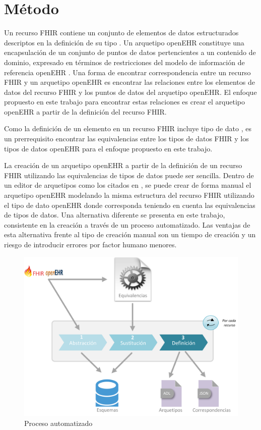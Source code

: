 \section{Método}

Un recurso FHIR contiene un conjunto de elementos de datos estructurados descriptos en la definición de su tipo \cite{FHIRResource}. Un arquetipo openEHR constituye una encapsulación de un conjunto de puntos de datos pertencientes a un contenido de dominio, expresado en términos de restricciones del modelo de información de referencia openEHR \cite{openEHRArchetype}. Una forma de encontrar correspondencia entre un recurso FHIR y un arquetipo openEHR es encontrar las relaciones entre los elementos de datos del recurso FHIR y los puntos de datos del arquetipo openEHR. El enfoque propuesto en este trabajo para encontrar estas relaciones es crear el arquetipo openEHR a partir de la definición del recurso FHIR.

Como la definición de un elemento en un recurso FHIR incluye tipo de dato \cite{FHIRElement}, es un prerrequisito encontrar las equivalencias entre los tipos de datos FHIR y los tipos de datos openEHR para el enfoque propuesto en este trabajo.

La creación de un arquetipo openEHR a partir de la definición de un recurso FHIR utilizando las equivalencias de tipos de datos puede ser sencilla. Dentro de un editor de arquetipos como los citados en \cite{openEHRModellingTools}, se puede crear de forma manual el arquetipo openEHR modelando la misma estructura del recurso FHIR utilizando el tipo de dato openEHR donde corresponda teniendo en cuenta las equivalencias de tipos de datos. Una alternativa diferente se presenta en este trabajo, consistente en la creación a través de un proceso automatizado. Las ventajas de esta alternativa frente al tipo de creación manual son un tiempo de creación y un riesgo de introducir errores por factor humano menores.

\begin{figure}[t]
  \centering
  \includegraphics[scale=0.6]{./images/solution}
  \caption{Proceso automatizado}
  \label{fig:solution}
\end{figure}




